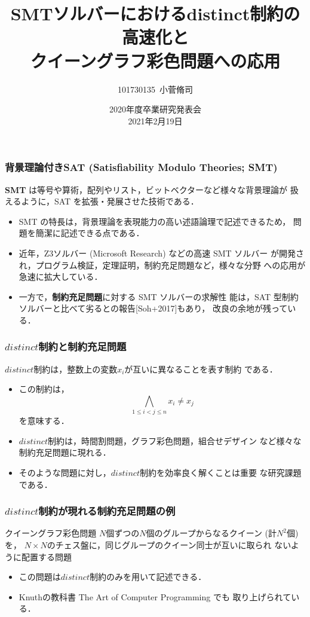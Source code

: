 \documentclass [dvipdfmx,11pt]{beamer}
\title[]{SMTソルバーにおけるdistinct制約の高速化と\\クイーングラフ彩色問題への応用}
\author{101730135~小菅脩司}
\institute{番原研究室}
\date{2020年度卒業研究発表会\\2021年2月19日}
\newcommand{\distinct}{$distinct$}
\begin{document}
\begin{frame} {}
    \titlepage
\end{frame}

\begin{frame}
  \frametitle{背景理論付きSAT {\large (Satisfiability Modulo Theories; SMT)}}
  \begin{alertblock}{}
    \alert{\bf SMT} は等号や算術，配列やリスト，ビットベクターなど様々な背景理論が
    扱えるように，SAT を拡張・発展させた技術である．
  \end{alertblock}
  \bigskip
  \begin{itemize}
  \item SMT の特長は，背景理論を表現能力の高い述語論理で記述できるため，
    問題を簡潔に記述できる点である．
  \item 近年，Z3ソルバー (Microsoft Research) などの高速 SMT ソルバー
    が開発され，プログラム検証，定理証明，制約充足問題など，様々な分野
    への応用が急速に拡大している．
  \item 一方で，\alert{\bf 制約充足問題}に対する SMT ソルバーの求解性
    能は，SAT 型制約ソルバーと比べて劣るとの報告[Soh+2017]もあり，
    改良の余地が残っている．
  \end{itemize}
\end{frame}
\begin{frame}
  \frametitle{{\distinct}制約と制約充足問題}
  \begin{alertblock}{}
    {\distinct}制約は，整数上の変数$x_{i}$が互いに異なることを表す制約
    である．
  \end{alertblock}
  \begin{itemize}
  \item この制約は，
    $$\bigwedge_{1 \leq i < j \leq n} x_i \neq x_j$$
    を意味する．
  \item {\distinct}制約は，時間割問題，グラフ彩色問題，組合せデザイン
    など様々な制約充足問題に現れる．
  \item そのような問題に対し，{\distinct}制約を効率良く解くことは重要
    な研究課題である．
  \end{itemize}
\end{frame}
\begin{frame}
  \frametitle{{\distinct}制約が現れる制約充足問題の例}
  \begin{block}{クイーングラフ彩色問題}
    $N$個ずつの$N$個のグループからなるクイーン (計$N^2$個) を，
    $N\times N$のチェス盤に，同じグループのクイーン同士が互いに取られ
    ないように配置する問題
  \end{block}
  
  \begin{itemize}
  \item この問題は{\distinct}制約のみを用いて記述できる．
  \item Knuthの教科書 The Art of Computer Programming でも
    取り上げられている．
  \end{itemize}
\end{frame}
\end{document}
